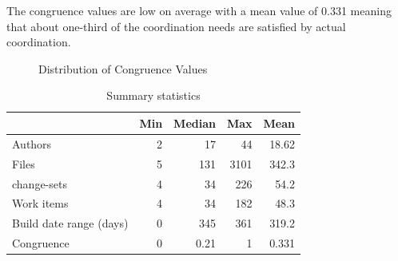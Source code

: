 The congruence values are low on average with a mean value of 0.331 meaning that about one-third of the coordination needs are satisfied by actual coordination.
\begin{figure}[t]
  \centering
	\caption{Distribution of Congruence Values}
	\label{fig:hist_unweighted_congruence}
\end{figure}

\begin{table}[t]
\centering
\begin{tabular}{lrrrr}
\toprule
 & Min & Median & Max & Mean\\\midrule
Authors & 2 & 17 & 44 & 18.62\\
Files & 5 & 131 & 3101 & 342.3 \\
change-sets & 4  & 34  & 226 & 54.2\\
Work items & 4 & 34  & 182 & 48.3 \\
Build date range (days) & 0  & 345  & 361 & 319.2 \\
Congruence & 0  & 0.21  & 1 & 0.331 \\
\bottomrule
\end{tabular}
\caption{Summary statistics}
\label{tab:summary}
\end{table}

